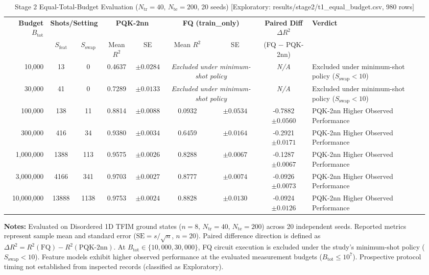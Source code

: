 \begin{table}[!t]
\caption{Stage 2 Equal-Total-Budget Evaluation ($N_{\mathrm{tr}}=40$, $N_{\mathrm{te}}=200$, 20 seeds) [Exploratory: results/stage2/t1_equal_budget.csv, 980 rows]}
\label{tab:equal_budget}
\centering
\begingroup
\small
\setlength{\tabcolsep}{4.5pt}
\begin{tabular}{@{}rcccccccl@{}}
\toprule
\textbf{Budget} $B_{\mathrm{tot}}$ & \multicolumn{2}{c}{\textbf{Shots/Setting}} & \multicolumn{2}{c}{\textbf{PQK-2nn}} & \multicolumn{2}{c}{\textbf{FQ (train\_only)}} & \textbf{Paired Diff} $\Delta R^2$ & \textbf{Verdict} \\
\cmidrule(lr){2-3}\cmidrule(lr){4-5}\cmidrule(lr){6-7}\cmidrule(lr){8-8}
 & $S_{\mathrm{feat}}$ & $S_{\mathrm{swap}}$ & Mean $R^2$ & SE & Mean $R^2$ & SE & (FQ $-$ PQK-2nn) & \\
\midrule
10,000 & 13 & 0 & 0.4637 & $\pm 0.0284$ & \multicolumn{2}{c}{\textit{Excluded under minimum-shot policy}} & \textit{N/A} & Excluded under minimum-shot policy ($S_{\mathrm{swap}} < 10$) \\
30,000 & 41 & 0 & 0.7289 & $\pm 0.0133$ & \multicolumn{2}{c}{\textit{Excluded under minimum-shot policy}} & \textit{N/A} & Excluded under minimum-shot policy ($S_{\mathrm{swap}} < 10$) \\
100,000 & 138 & 11 & 0.8814 & $\pm 0.0088$ & 0.0932 & $\pm 0.0534$ & -0.7882 $\pm 0.0560$ & PQK-2nn Higher Observed Performance \\
300,000 & 416 & 34 & 0.9380 & $\pm 0.0034$ & 0.6459 & $\pm 0.0164$ & -0.2921 $\pm 0.0171$ & PQK-2nn Higher Observed Performance \\
1,000,000 & 1388 & 113 & 0.9575 & $\pm 0.0026$ & 0.8288 & $\pm 0.0067$ & -0.1287 $\pm 0.0067$ & PQK-2nn Higher Observed Performance \\
3,000,000 & 4166 & 341 & 0.9703 & $\pm 0.0027$ & 0.8777 & $\pm 0.0074$ & -0.0926 $\pm 0.0073$ & PQK-2nn Higher Observed Performance \\
10,000,000 & 13888 & 1138 & 0.9753 & $\pm 0.0024$ & 0.8828 & $\pm 0.0130$ & -0.0924 $\pm 0.0126$ & PQK-2nn Higher Observed Performance \\
\bottomrule
\end{tabular}
\endgroup
\vspace{1ex}
{\raggedright \footnotesize \textbf{Notes:} Evaluated on Disordered 1D TFIM ground states ($n=8$, $N_{\mathrm{tr}}=40$, $N_{\mathrm{te}}=200$) across 20 independent seeds. Reported metrics represent sample mean and standard error ($\mathrm{SE} = s / \sqrt{n}$, $n=20$). Paired difference direction is defined as $\Delta R^2 = R^2(\mathrm{FQ}) - R^2(\mathrm{PQK\text{-}2nn})$. At $B_{\mathrm{tot}} \in \{10{,}000, 30{,}000\}$, FQ circuit execution is excluded under the study's minimum-shot policy ($S_{\mathrm{swap}} < 10$). Feature models exhibit higher observed performance at the evaluated measurement budgets ($B_{\mathrm{tot}} \le 10^7$). Prospective protocol timing not established from inspected records (classified as Exploratory).\par}
\end{table}
